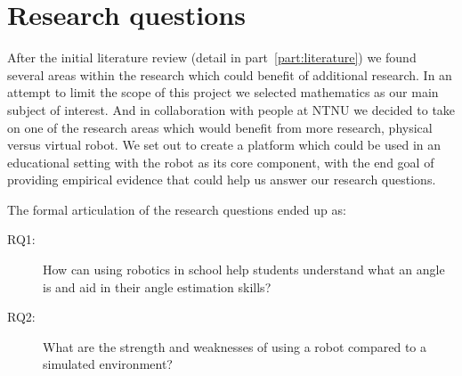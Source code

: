 \section{Research questions}
After the initial literature review (detail in part~\ref{part:literature}) we found several areas within the research which could benefit of additional research. 
In an attempt to limit the scope of this project we selected mathematics as our main subject of interest. And in collaboration with people at NTNU we decided to take on one of the research areas which would benefit from more research, physical versus virtual robot. 
We set out to create a platform which could be used in an educational setting with the \chirp robot as its core component, with the end goal of providing empirical evidence that could help us answer our research questions. 

\bigskip\noindent
The formal articulation of the research questions ended up as:
\begin{description}
	\item[RQ1: ] How can using robotics in school help students understand what an angle is and aid in their angle estimation skills?
	\item[RQ2: ] What are the strength and weaknesses of using a robot compared to a simulated environment?
\end{description}
